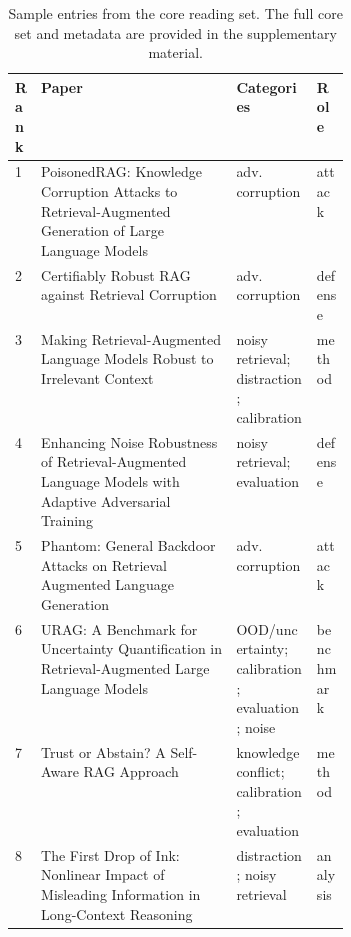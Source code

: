\begin{table}[t]
\centering
\scriptsize
\begin{tabularx}{\linewidth}{p{0.05\linewidth}X p{0.24\linewidth} p{0.10\linewidth}}
\toprule
Rank & Paper & Categories & Role \\
\midrule
1 & PoisonedRAG: Knowledge Corruption Attacks to Retrieval-Augmented Generation of Large Language Models & adv. corruption & attack \\
2 & Certifiably Robust RAG against Retrieval Corruption & adv. corruption & defense \\
3 & Making Retrieval-Augmented Language Models Robust to Irrelevant Context & noisy retrieval; distraction; calibration & method \\
4 & Enhancing Noise Robustness of Retrieval-Augmented Language Models with Adaptive Adversarial Training & noisy retrieval; evaluation & defense \\
5 & Phantom: General Backdoor Attacks on Retrieval Augmented Language Generation & adv. corruption & attack \\
6 & URAG: A Benchmark for Uncertainty Quantification in Retrieval-Augmented Large Language Models & OOD/uncertainty; calibration; evaluation; noise & benchmark \\
7 & Trust or Abstain? A Self-Aware RAG Approach & knowledge conflict; calibration; evaluation & method \\
8 & The First Drop of Ink: Nonlinear Impact of Misleading Information in Long-Context Reasoning & distraction; noisy retrieval & analysis \\
\bottomrule
\end{tabularx}
\caption{Sample entries from the core reading set. The full core set and metadata are provided in the supplementary material.}
\label{tab:core-sample}
\end{table}
